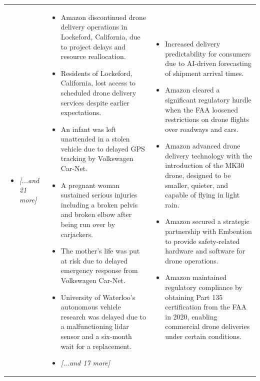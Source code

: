 \begin{longtable}{p{5.2cm}|p{5.2cm}|p{5.2cm}}
\begin{itemize}[leftmargin=*, nosep, before=\vspace{-0.5\baselineskip}, after=\vspace{-0.5\baselineskip}]
\item \textit{[...and 21 more]}
\end{itemize} & \begin{itemize}[leftmargin=*, nosep, before=\vspace{-0.5\baselineskip}, after=\vspace{-0.5\baselineskip}] 
\footnotesize
\item Amazon discontinued drone delivery operations in Lockeford, California, due to project delays and resource reallocation.
\item Residents of Lockeford, California, lost access to scheduled drone delivery services despite earlier expectations.
\item An infant was left unattended in a stolen vehicle due to delayed GPS tracking by Volkswagen Car-Net.
\item A pregnant woman sustained serious injuries including a broken pelvis and broken elbow after being run over by carjackers.
\item The mother's life was put at risk due to delayed emergency response from Volkswagen Car-Net.
\item University of Waterloo's autonomous vehicle research was delayed due to a malfunctioning lidar sensor and a six-month wait for a replacement.
\item \textit{[...and 17 more]}
\end{itemize} & \begin{itemize}[leftmargin=*, nosep, before=\vspace{-0.5\baselineskip}, after=\vspace{-0.5\baselineskip}] 
\footnotesize
\item Increased delivery predictability for consumers due to AI-driven forecasting of shipment arrival times.
\item Amazon cleared a significant regulatory hurdle when the FAA loosened restrictions on drone flights over roadways and cars.
\item Amazon advanced drone delivery technology with the introduction of the MK30 drone, designed to be smaller, quieter, and capable of flying in light rain.
\item Amazon secured a strategic partnership with Embention to provide safety-related hardware and software for drone operations.
\item Amazon maintained regulatory compliance by obtaining Part 135 certification from the FAA in 2020, enabling commercial drone deliveries under certain conditions.

\end{itemize}
\end{longtable}
